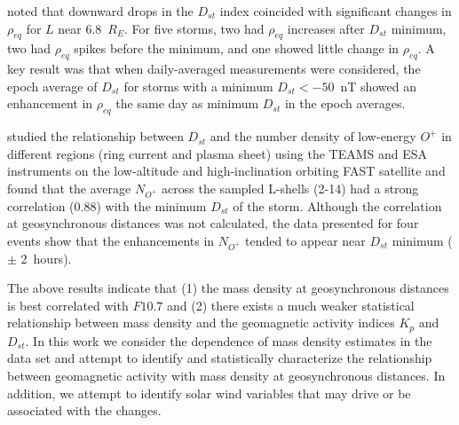 \documentclass[12pt]{article}
\begin{document}
\cite{Takahashi2010} noted that downward drops in the $D_{st}$ index coincided with significant changes in $\rho_{eq}$ for $L$ near 6.8~$R_E$. For five storms, two had $\rho_{eq}$ increases after $D_{st}$ minimum, two had $\rho_{eq}$ spikes before the minimum, and one showed little change in $\rho_{eq}$.  A key result was that when daily-averaged measurements were considered, the epoch average of $D_{st}$ for storms with a minimum $D_{st} < -50$~nT showed an enhancement in $\rho_{eq}$ the same day as minimum $D_{st}$ in the epoch averages.

\cite{Yao2008} studied the relationship between $D_{st}$ and the number density of low-energy $O^+$ in different regions (ring current and plasma sheet) using the TEAMS and ESA instruments on the low-altitude and high-inclination orbiting FAST satellite and found that the average $N_{O^+}$ across the sampled L-shells (2-14) had a strong correlation (0.88) with the minimum $D_{st}$ of the storm.  Although the correlation at geosynchronous distances was not calculated, the data presented for four events show that the enhancements in $N_{O^+}$ tended to appear near $D_{st}$ minimum ($\pm$ 2~hours).

The above results indicate that (1) the mass density at geosynchronous distances is best correlated with $F10.7$ and (2) there exists a much weaker statistical relationship between mass density and the geomagnetic activity indices $K_p$ and $D_{st}$.  In this work we consider the dependence of mass density estimates in the \cite{Takahashi2010} data set and attempt to identify and statistically characterize the relationship between geomagnetic activity with mass density at geosynchronous distances.  In addition, we attempt to identify solar wind variables that may drive or be associated with the changes. 

\end{document}
